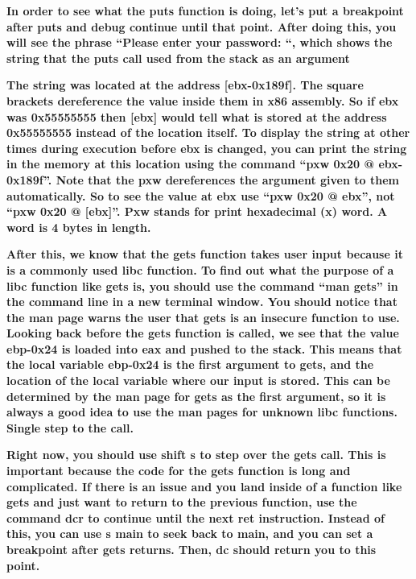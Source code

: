 \documentclass[letterpaper]{article}
\newcommand{\sitfig}[3]{
\begin{figure}[H]
\centering
\makebox[\textwidth][c]{
#2
}
\label{#1}
\end{figure}
}
\newcommand{\sitgfx}[4][scale=1.0]{
\sitfig{#3}{\texttt{[image: \#2]}}{#4}
}
\begin{document}
\textbf{In order to see what the puts function is doing, let's put a breakpoint after puts and debug continue until that
point. After doing this, you will see the phrase ``Please enter your password: ``, which shows the string that the puts
call used from the stack as an argument}

\textbf{The string was located at the address [ebx-0x189f]. The square brackets dereference the value inside them in x86
assembly. So if ebx was 0x55555555 then [ebx] would tell what is stored at the address 0x55555555 instead of the
location itself. To display the string at other times during execution before ebx is changed, you can print the string
in the memory at this location using the command ``pxw 0x20 @ ebx-0x189f''. Note that the pxw dereferences the argument
given to them automatically. So to see the value at ebx use ``pxw 0x20 @ ebx'', not ``pxw 0x20 @ [ebx]''. Pxw stands
for print hexadecimal (x) word. A word is 4 bytes in length. }

  
\sitgfx[width=6.5in,height=4.0626in]{FINALWORKINGDOCFORMERLYPRECURSOR-img058.png}{fig:unk}{TODO CAPTION}
 

\textbf{After this, we know that the gets function takes user input because it is a commonly used libc function. To find
out what the purpose of a libc function like gets is, you should use the command ``man gets'' in the command line in a
new terminal window. You should notice that the man page warns the user that gets is an insecure function to use.
Looking back before the gets function is called, we see that the value ebp-0x24 is loaded into eax and pushed to the
stack. This means that the local variable ebp-0x24 is the first argument to gets, and the location of the local
variable where our input is stored. This can be determined by the man page for gets as the first argument, so it is
always a good idea to use the man pages for unknown libc functions. Single step to the call.}

  
\sitgfx[width=6.5in,height=4.0626in]{FINALWORKINGDOCFORMERLYPRECURSOR-img059.png}{fig:unk}{TODO CAPTION}
 

  
\sitgfx[width=6.5in,height=4.0626in]{FINALWORKINGDOCFORMERLYPRECURSOR-img060.png}{fig:unk}{TODO CAPTION}
 

\textbf{Right now, you should use shift s to step over the gets call. This is important because the code for the gets
function is long and complicated. If there is an issue and you land inside of a function like gets and just want to
return to the previous function, use the command dcr to continue until the next ret instruction. Instead of this, you
can use s main to seek back to main, and you can set a breakpoint after gets returns. Then, dc should return you to
this point.}
\end{document}
